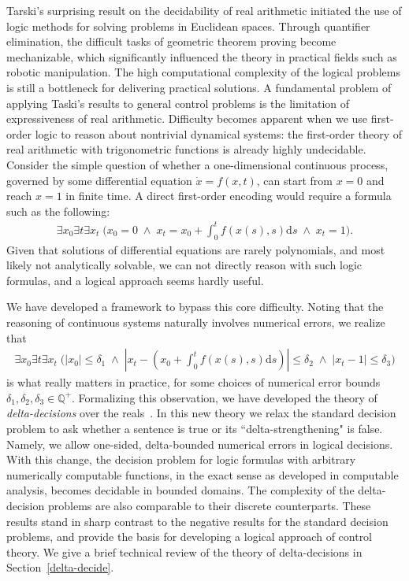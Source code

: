\documentclass[10pt]{article}
\theoremstyle{definition}
\begin{document}
Tarski's surprising result on the decidability of real arithmetic initiated the use of logic methods for solving problems in Euclidean spaces. Through quantifier elimination, the difficult tasks of geometric theorem proving become mechanizable, which significantly influenced the theory in practical fields such as robotic manipulation. The high computational complexity of the logical problems is still a bottleneck for delivering practical solutions. A fundamental problem of applying Taski's results to general control problems is the limitation of expressiveness of real arithmetic. Difficulty becomes apparent when we use first-order logic to reason about nontrivial dynamical systems: the first-order theory of real arithmetic with trigonometric functions is already highly undecidable. Consider the simple question of whether a one-dimensional continuous process, governed by some differential equation $\dot{x} = f(x,t)$, can start from $x=0$ and reach $x=1$ in finite time. A direct first-order encoding would require a formula such as the following:
\begin{eqnarray*}
\exists x_0 \exists t \exists x_t\; \bigg(x_0 = 0 \;\wedge\; x_t = x_0 + \int_{0}^t f(x(s),s)\mathrm{d}s\; \wedge\; x_t = 1\bigg).
\end{eqnarray*}
Given that solutions of differential equations are rarely polynomials, and most likely not analytically solvable, we can not directly reason with such logic formulas, and a logical approach seems hardly useful. 

We have developed a framework to bypass this core difficulty. Noting that the reasoning of continuous systems naturally involves numerical errors, we realize that
\begin{eqnarray*}
\exists x_0 \exists t \exists x_t\; \bigg(|x_0| \leq \delta_1 \;\wedge\; |x_t - (x_0 + \int_{0}^t f(x(s),s)\mathrm{d}s)| \leq \delta_2\; \wedge\; |x_t - 1|\leq \delta_3\bigg)
\end{eqnarray*}
is what really matters in practice, for some choices of numerical error bounds $\delta_1, \delta_2, \delta_3\in\mathbb{Q}^+$. Formalizing this observation, we have developed the theory of {\em delta-decisions} over the reals~\cite{DBLP:conf/lics/GaoAC12,DBLP:conf/cade/GaoAC12}. In this new theory we relax the standard decision problem to ask whether a sentence is true or its ``delta-strengthening" is false. Namely, we allow one-sided, delta-bounded numerical errors in logical decisions. With this change, the decision problem for logic formulas with arbitrary numerically computable functions, in the exact sense as developed in computable analysis, becomes decidable in bounded domains. The complexity of the delta-decision problems are also comparable to their discrete counterparts. These results stand in sharp contrast to the negative results for the standard decision problems, and provide the basis for developing a logical approach of control theory. We give a brief technical review of the theory of delta-decisions in Section~\ref{delta-decide}. 
\end{document}
